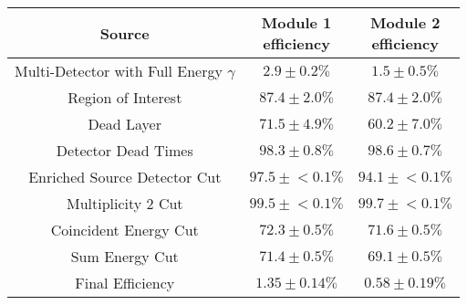 \begin{tabular}{|c|c|c|}
\hline
  Source & \makecell{Module 1\\efficiency} & \makecell{Module 2\\efficiency} \\
\hline
  \makecell{Multi-Detector with\\Full Energy $\gamma$} & $2.9 \pm 0.2\%$ & $1.5 \pm 0.5\%$ \\
  Region of Interest & $87.4 \pm 2.0\%$ & $87.4 \pm 2.0\%$ \\
  Dead Layer & $71.5 \pm 4.9\%$ & $60.2 \pm 7.0\%$ \\
  Detector Dead Times & $98.3 \pm 0.8\%$ & $98.6 \pm 0.7\%$ \\
  Enriched Source Detector Cut & $97.5 \pm{}<\!0.1\%$ & $94.1 \pm{}<\!0.1\%$ \\
  Multiplicity 2 Cut & $99.5 \pm{}<\!0.1\%$ & $99.7 \pm{}<\!0.1\%$ \\
  Coincident Energy Cut & $72.3 \pm 0.5\%$ & $71.6 \pm 0.5\%$ \\
  Sum Energy Cut & $71.4 \pm 0.5\%$ & $69.1 \pm 0.5\%$ \\
  \hline Final Efficiency & $1.35 \pm 0.14\%$ & $0.58 \pm 0.19\%$ \\
\hline
\end{tabular}
